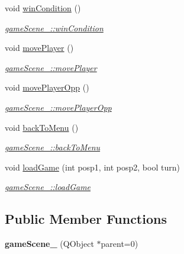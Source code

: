\begin{DoxyCompactItemize}
\item 
void \hyperlink{classgameScene__1_a026876720e48a3afb040f8bc19ec6279}{win\-Condition} ()
\begin{DoxyCompactList}\small\item\em \hyperlink{classgameScene__1_a026876720e48a3afb040f8bc19ec6279}{game\-Scene\-\_\-::win\-Condition} \end{DoxyCompactList}\item 
void \hyperlink{classgameScene__1_a815b68676c0afc94ba757fe37e42af69}{move\-Player} ()
\begin{DoxyCompactList}\small\item\em \hyperlink{classgameScene__1_a815b68676c0afc94ba757fe37e42af69}{game\-Scene\-\_\-::move\-Player} \end{DoxyCompactList}\item 
void \hyperlink{classgameScene__1_a3e3e9cf17cfb4439cc2bf264b7d7ec19}{move\-Player\-Opp} ()
\begin{DoxyCompactList}\small\item\em \hyperlink{classgameScene__1_a3e3e9cf17cfb4439cc2bf264b7d7ec19}{game\-Scene\-\_\-::move\-Player\-Opp} \end{DoxyCompactList}\item 
void \hyperlink{classgameScene__1_a45979d160308acb26e5cd60b00568bb4}{back\-To\-Menu} ()
\begin{DoxyCompactList}\small\item\em \hyperlink{classgameScene__1_a45979d160308acb26e5cd60b00568bb4}{game\-Scene\-\_\-::back\-To\-Menu} \end{DoxyCompactList}\item 
void \hyperlink{classgameScene__1_aecddbe4488e834439b5f0313478be689}{load\-Game} (int posp1, int posp2, bool turn)
\begin{DoxyCompactList}\small\item\em \hyperlink{classgameScene__1_aecddbe4488e834439b5f0313478be689}{game\-Scene\-\_\-::load\-Game} \end{DoxyCompactList}\end{DoxyCompactItemize}
\subsection*{Public Member Functions}
\begin{DoxyCompactItemize}
\item 
\hypertarget{classgameScene__1_a8a253c42464547dff6802cc48f1b40f8}{{\bfseries game\-Scene\-\_} (Q\-Object $\ast$parent=0)}\label{classgameScene__1_a8a253c42464547dff6802cc48f1b40f8}

\end{DoxyCompactItemize}
